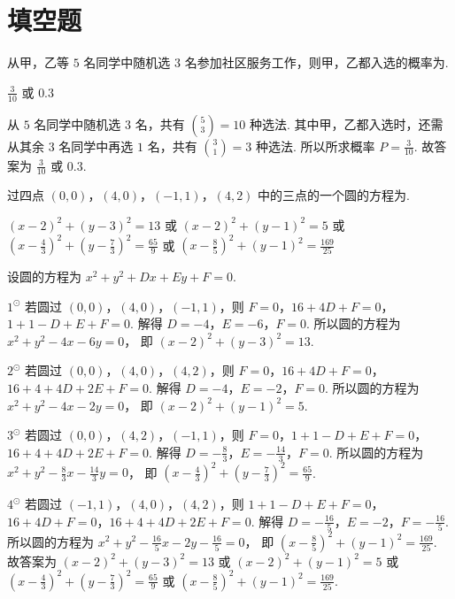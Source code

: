 \section{填空题}

\begin{problem}
从甲，乙等 \(5\) 名同学中随机选 \(3\) 名参加社区服务工作，则甲，乙都入选的概率为\fillinblank{}.
\end{problem}

\begin{answer}
\(\frac{3}{10}\) 或 \(0.3\)
\end{answer}

\begin{solution}
从 \(5\) 名同学中随机选 \(3\) 名，共有
\(\binom{5}{3}=10\)
种选法.
其中甲，乙都入选时，还需从其余 \(3\) 名同学中再选 \(1\) 名，共有
\(\binom{3}{1}=3\)
种选法.
所以所求概率
\(P=\frac{3}{10}\).
故答案为 \(\frac{3}{10}\) 或 \(0.3\).
\end{solution}

\begin{problem}
过四点 \((0,0)\)，\((4,0)\)，\((-1,1)\)，\((4,2)\) 中的三点的一个圆的方程为\fillinblank{}.
\end{problem}

\begin{answer}
\((x-2)^2+(y-3)^2=13\) 或 \((x-2)^2+(y-1)^2=5\) 或 \(\left( x-\frac{4}{3} \right)^2+\left( y-\frac{7}{3} \right)^2=\frac{65}{9}\) 或 \(\left( x-\frac{8}{5} \right)^2+(y-1)^2=\frac{169}{25}\)
\end{answer}

\begin{solution}
设圆的方程为 \(x^2+y^2+Dx+Ey+F=0\).

\(1^{\odot}\) 若圆过 \((0,0)\)，\((4,0)\)，\((-1,1)\)，则 \(F=0\)，\(16+4D+F=0\)，\(1+1-D+E+F=0\).
解得
\(D=-4\)，\(E=-6\)，\(F=0\).
所以圆的方程为
\(x^2+y^2-4x-6y=0\)，
即
\(\left( x-2 \right)^2+\left( y-3 \right)^2=13\).

\(2^{\odot}\) 若圆过 \((0,0)\)，\((4,0)\)，\((4,2)\)，则 \(F=0\)，\(16+4D+F=0\)，\(16+4+4D+2E+F=0\).
解得
\(D=-4\)，\(E=-2\)，\(F=0\).
所以圆的方程为
\(x^2+y^2-4x-2y=0\)，
即
\(\left( x-2 \right)^2+\left( y-1 \right)^2=5\).

\(3^{\odot}\) 若圆过 \((0,0)\)，\((4,2)\)，\((-1,1)\)，则 \(F=0\)，\(1+1-D+E+F=0\)，\(16+4+4D+2E+F=0\).
解得
\(D=-\frac{8}{3}\)，\(E=-\frac{14}{3}\)，\(F=0\).
所以圆的方程为
\(x^2+y^2-\frac{8}{3}x-\frac{14}{3}y=0\)，
即
\(\left( x-\frac{4}{3} \right)^2+\left( y-\frac{7}{3} \right)^2=\frac{65}{9}\).

\(4^{\odot}\) 若圆过 \((-1,1)\)，\((4,0)\)，\((4,2)\)，则 \(1+1-D+E+F=0\)，\(16+4D+F=0\)，\(16+4+4D+2E+F=0\).
解得
\(D=-\frac{16}{5}\)，\(E=-2\)，\(F=-\frac{16}{5}\).
所以圆的方程为
\(x^2+y^2-\frac{16}{5}x-2y-\frac{16}{5}=0\)，
即
\(\left( x-\frac{8}{5} \right)^2+\left( y-1 \right)^2=\frac{169}{25}\).
故答案为 \(\left( x-2 \right)^2+\left( y-3 \right)^2=13\) 或 \(\left( x-2 \right)^2+\left( y-1 \right)^2=5\) 或 \(\left( x-\frac{4}{3} \right)^2+\left( y-\frac{7}{3} \right)^2=\frac{65}{9}\) 或 \(\left( x-\frac{8}{5} \right)^2+\left( y-1 \right)^2=\frac{169}{25}\).
\end{solution}

